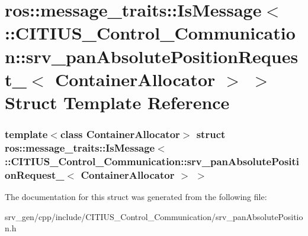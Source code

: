 \hypertarget{structros_1_1message__traits_1_1_is_message_3_01_1_1_c_i_t_i_u_s___control___communication_1_1sr347cac6965a0f5f1a5fa9d58c0996770}{\section{ros\-:\-:message\-\_\-traits\-:\-:\-Is\-Message$<$ \-:\-:\-C\-I\-T\-I\-U\-S\-\_\-\-Control\-\_\-\-Communication\-:\-:srv\-\_\-pan\-Absolute\-Position\-Request\-\_\-$<$ \-Container\-Allocator $>$ $>$ \-Struct \-Template \-Reference}
\label{structros_1_1message__traits_1_1_is_message_3_01_1_1_c_i_t_i_u_s___control___communication_1_1sr347cac6965a0f5f1a5fa9d58c0996770}
}
\subsubsection*{template$<$class Container\-Allocator$>$ struct ros\-::message\-\_\-traits\-::\-Is\-Message$<$ \-::\-C\-I\-T\-I\-U\-S\-\_\-\-Control\-\_\-\-Communication\-::srv\-\_\-pan\-Absolute\-Position\-Request\-\_\-$<$ Container\-Allocator $>$ $>$}



\-The documentation for this struct was generated from the following file\-:\begin{DoxyCompactItemize}
\item 
srv\-\_\-gen/cpp/include/\-C\-I\-T\-I\-U\-S\-\_\-\-Control\-\_\-\-Communication/srv\-\_\-pan\-Absolute\-Position.\-h\end{DoxyCompactItemize}
